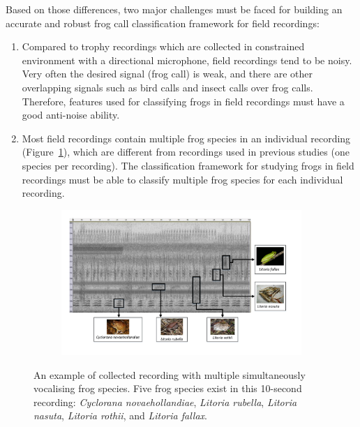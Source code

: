 Based on those differences, two major challenges must be faced for building an accurate and robust frog call classification framework for field recordings:

\begin{enumerate}
\item  Compared to trophy recordings which are collected in constrained environment with a directional microphone, field recordings tend to be noisy. Very often the desired signal (frog call) is weak, and there are other overlapping signals such as bird calls and insect calls over frog calls. Therefore, features used for classifying frogs in field recordings must have a good anti-noise ability.


\item  Most field recordings contain multiple frog species in an individual recording (Figure~\ref{fig:label}), which are different from recordings used in previous studies (one species per recording). The classification framework for studying frogs in field recordings must be able to classify multiple frog species for each individual recording.

\end{enumerate}
 


\begin{figure}[htb!]
\centering
    \begin{subfigure}[b]{\textwidth}
           \includegraphics[width=1\textwidth]{image/LR/label.pdf}
    \end{subfigure}%
\caption[An example of collected recording]{An example of collected recording with multiple simultaneously vocalising frog species. Five frog species exist in this 10-second recording: \textit{Cyclorana novaehollandiae}, \textit{Litoria rubella}, \textit{Litoria nasuta}, \textit{Litoria rothii}, and \textit{Litoria fallax}.}
\label{fig:label}       
\end{figure}




